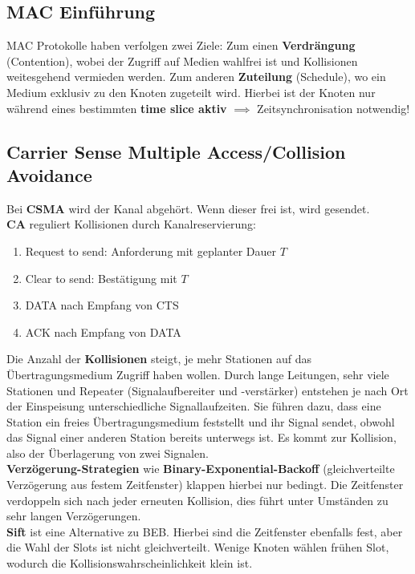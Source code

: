 \documentclass[a4paper]{article}
\begin{document}
\subsection{MAC Einführung}
MAC Protokolle haben verfolgen zwei Ziele: Zum einen \textbf{Verdrängung} (Contention), wobei der Zugriff auf Medien wahlfrei ist und Kollisionen weitesgehend vermieden werden. Zum anderen \textbf{Zuteilung} (Schedule), wo ein Medium exklusiv zu den Knoten zugeteilt wird. Hierbei ist der Knoten nur während eines bestimmten \textbf{time slice aktiv} $\implies$ Zeitsynchronisation notwendig!
\subsection{Carrier Sense Multiple Access/Collision Avoidance}
Bei \textbf{CSMA} wird der Kanal abgehört. Wenn dieser frei ist, wird gesendet.\\
\textbf{CA} reguliert Kollisionen durch Kanalreservierung:
\begin{enumerate}
	\item Request to send: Anforderung mit geplanter Dauer $T$
	\item Clear to send: Bestätigung mit $T$
	\item DATA nach Empfang von CTS
	\item ACK nach Empfang von DATA
\end{enumerate}
Die Anzahl der \textbf{Kollisionen} steigt, je mehr Stationen auf das Übertragungsmedium Zugriff haben wollen. Durch lange Leitungen, sehr viele Stationen und Repeater (Signalaufbereiter und -verstärker) entstehen je nach Ort der Einspeisung unterschiedliche Signallaufzeiten. Sie führen dazu, dass eine Station ein freies Übertragungsmedium feststellt und ihr Signal sendet, obwohl das Signal einer anderen Station bereits unterwegs ist. Es kommt zur Kollision, also der Überlagerung von zwei Signalen.\\

\textbf{Verzögerung-Strategien} wie \textbf{Binary-Exponential-Backoff} (gleichverteilte Verzögerung aus festem Zeitfenster) klappen hierbei nur bedingt. Die Zeitfenster verdoppeln sich nach jeder erneuten Kollision, dies führt unter Umständen zu sehr langen Verzögerungen.\\

\textbf{Sift} ist eine Alternative zu BEB. Hierbei sind die Zeitfenster ebenfalls fest, aber die Wahl der Slots ist nicht gleichverteilt. Wenige Knoten wählen frühen Slot, wodurch die Kollisionswahrscheinlichkeit klein ist.\\
\end{document}
